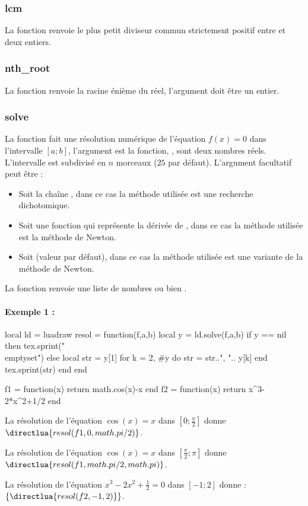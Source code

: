 \subsubsection{lcm}
La fonction  renvoie le plus petit diviseur commun strictement positif entre  et  deux entiers.

\subsubsection{nth\_root}
La fonction  renvoie la racine énième du réel, l'argument  doit être un entier.

\subsubsection{solve}
La fonction  fait une résolution numérique de l'équation $f(x)=0$ dans l'intervalle $[a;b]$, l'argument  est la fonction, ,  sont deux nombres réels. L'intervalle est subdivisé en $n$ morceaux ($25$ par défaut). L'argument facultatif  peut être :
\begin{itemize}
    \item Soit la chaîne , dans ce cas la méthode utilisée est une recherche dichotomique.
    \item Soit une fonction qui représente la dérivée de , dans ce cas la méthode utilisée est la méthode de Newton.
    \item Soit \nil (valeur par défaut), dans ce cas la méthode utilisée est une variante de la méthode de Newton.
\end{itemize}
La fonction renvoie une liste de nombres ou bien \nil.

\paragraph{Exemple 1 :}
\begin{TeXcode}
\begin{luacode}
local ld = luadraw
resol = function(f,a,b)
    local y = ld.solve(f,a,b)
    if y == nil then tex.sprint("\\emptyset")
    else
        local str = y[1]
        for k = 2, #y do
            str = str..", ".. y[k]
        end
        tex.sprint(str)
    end
end
\end{luacode}
\def\solve#1#2#3{\directlua{resol(#1,#2,#3)}}%
\begin{luacode}
f1 = function(x) return math.cos(x)-x end
f2 = function(x) return x^3-2*x^2+1/2 end
\end{luacode}
La résolution de l'équation $\cos(x)=x$ dans $[0;\frac{\pi}2]$ donne $\solve{f1}{0}{math.pi/2}$.\par
La résolution de l'équation $\cos(x)=x$ dans $[\frac{\pi}2;\pi]$ donne $\solve{f1}{math.pi/2}{math.pi}$.\par
La résolution de l'équation $x^3-2x^2+\frac12=0$ dans $[-1;2]$ donne : $\{\solve{f2}{-1}{2}\}$.
\end{TeXcode}
